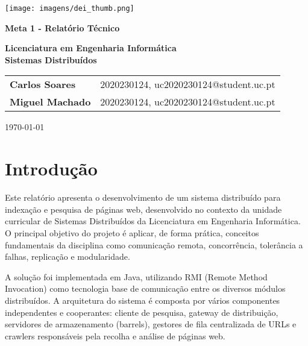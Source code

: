 \documentclass{article}
\begin{document}
\begin{titlepage}
    \centering
    \vspace*{1cm}

    \texttt{[image: imagens/dei\_thumb.png]}

    \vspace{1.5cm}
    {\LARGE \textbf{Meta 1 - Relatório Técnico} \par}
    \vspace{0.5cm}
    \vspace{2.5cm}
    \textbf{Licenciatura em Engenharia Informática} \\
    \textbf{Sistemas Distribuídos}

    \vspace{3cm}
    \begin{tabular}{ll}
        \textbf{Carlos Soares} & 2020230124, uc2020230124@student.uc.pt \\
        \textbf{Miguel Machado} & 2020230124, uc2020230124@student.uc.pt 
    \end{tabular}

    \vfill
    {\large \today \par}
\end{titlepage}



\newpage
\tableofcontents
\newpage



\section{Introdução}

Este relatório apresenta o desenvolvimento de um sistema distribuído para indexação e pesquisa de páginas web, desenvolvido no contexto da unidade curricular de Sistemas Distribuídos da Licenciatura em Engenharia Informática. O principal objetivo do projeto é aplicar, de forma prática, conceitos fundamentais da disciplina como comunicação remota, concorrência, tolerância a falhas, replicação e modularidade.

A solução foi implementada em Java, utilizando RMI (Remote Method Invocation) como tecnologia base de comunicação entre os diversos módulos distribuídos. A arquitetura do sistema é composta por vários componentes independentes e cooperantes: cliente de pesquisa, gateway de distribuição, servidores de armazenamento (barrels), gestores de fila centralizada de URLs e crawlers responsáveis pela recolha e análise de páginas web.
\end{document}
